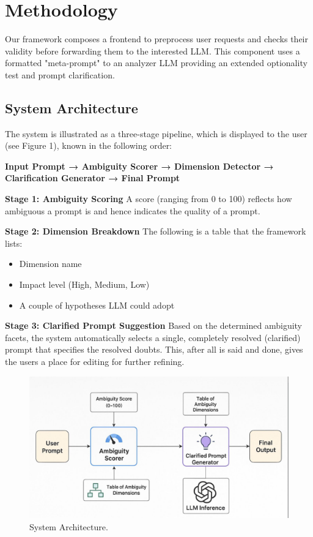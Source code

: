 \documentclass[conference]{IEEEtran}
\begin{document}
\section{Methodology}
Our framework composes a frontend to preprocess user requests and checks their validity before forwarding them to the interested LLM. This component uses a formatted "meta-prompt" to an analyzer LLM providing an extended optionality test and prompt clarification.

\subsection{System Architecture}
The system is illustrated as a three-stage pipeline, which is displayed to the user (see Figure 1), known in the following order:

\textbf{Input Prompt → Ambiguity Scorer → Dimension Detector → Clarification Generator → Final Prompt}

\textbf{Stage 1: Ambiguity Scoring}
A score (ranging from 0 to 100) reflects how ambiguous a prompt is and hence indicates the quality of a prompt.

\textbf{Stage 2: Dimension Breakdown}
The following is a table that the framework lists:
\begin{itemize}
    \item Dimension name
    \item Impact level (High, Medium, Low)
    \item A couple of hypotheses LLM could adopt
\end{itemize}

\textbf{Stage 3: Clarified Prompt Suggestion}
Based on the determined ambiguity facets, the system automatically selects a single, completely resolved (clarified) prompt that specifies the resolved doubts. This, after all is said and done, gives the users a place for editing for further refining.

\begin{figure}[!t]
\centering
\includegraphics[width=\columnwidth]{images/Figure1.jpeg}
\caption{System Architecture.}
\label{fig_sim}
\end{figure}
\end{document}
